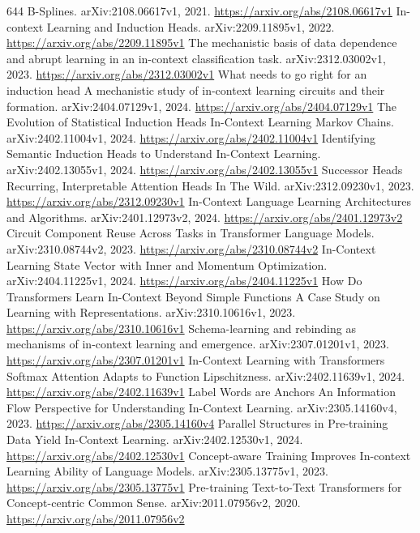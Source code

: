 \documentclass[11pt]{article}
\begin{document}
\begin{thebibliography}{644}
 B-Splines. arXiv:2108.06617v1, 2021. \url{https://arxiv.org/abs/2108.06617v1}
 In-context Learning and Induction Heads. arXiv:2209.11895v1, 2022. \url{https://arxiv.org/abs/2209.11895v1}
 The mechanistic basis of data dependence and abrupt learning in an in-context classification task. arXiv:2312.03002v1, 2023. \url{https://arxiv.org/abs/2312.03002v1}
 What needs to go right for an induction head A mechanistic study of in-context learning circuits and their formation. arXiv:2404.07129v1, 2024. \url{https://arxiv.org/abs/2404.07129v1}
 The Evolution of Statistical Induction Heads In-Context Learning Markov Chains. arXiv:2402.11004v1, 2024. \url{https://arxiv.org/abs/2402.11004v1}
 Identifying Semantic Induction Heads to Understand In-Context Learning. arXiv:2402.13055v1, 2024. \url{https://arxiv.org/abs/2402.13055v1}
 Successor Heads Recurring, Interpretable Attention Heads In The Wild. arXiv:2312.09230v1, 2023. \url{https://arxiv.org/abs/2312.09230v1}
 In-Context Language Learning Architectures and Algorithms. arXiv:2401.12973v2, 2024. \url{https://arxiv.org/abs/2401.12973v2}
 Circuit Component Reuse Across Tasks in Transformer Language Models. arXiv:2310.08744v2, 2023. \url{https://arxiv.org/abs/2310.08744v2}
 In-Context Learning State Vector with Inner and Momentum Optimization. arXiv:2404.11225v1, 2024. \url{https://arxiv.org/abs/2404.11225v1}
 How Do Transformers Learn In-Context Beyond Simple Functions A Case Study on Learning with Representations. arXiv:2310.10616v1, 2023. \url{https://arxiv.org/abs/2310.10616v1}
 Schema-learning and rebinding as mechanisms of in-context learning and emergence. arXiv:2307.01201v1, 2023. \url{https://arxiv.org/abs/2307.01201v1}
 In-Context Learning with Transformers Softmax Attention Adapts to Function Lipschitzness. arXiv:2402.11639v1, 2024. \url{https://arxiv.org/abs/2402.11639v1}
 Label Words are Anchors An Information Flow Perspective for Understanding In-Context Learning. arXiv:2305.14160v4, 2023. \url{https://arxiv.org/abs/2305.14160v4}
 Parallel Structures in Pre-training Data Yield In-Context Learning. arXiv:2402.12530v1, 2024. \url{https://arxiv.org/abs/2402.12530v1}
 Concept-aware Training Improves In-context Learning Ability of Language Models. arXiv:2305.13775v1, 2023. \url{https://arxiv.org/abs/2305.13775v1}
 Pre-training Text-to-Text Transformers for Concept-centric Common Sense. arXiv:2011.07956v2, 2020. \url{https://arxiv.org/abs/2011.07956v2}

\end{thebibliography}
\end{document}
